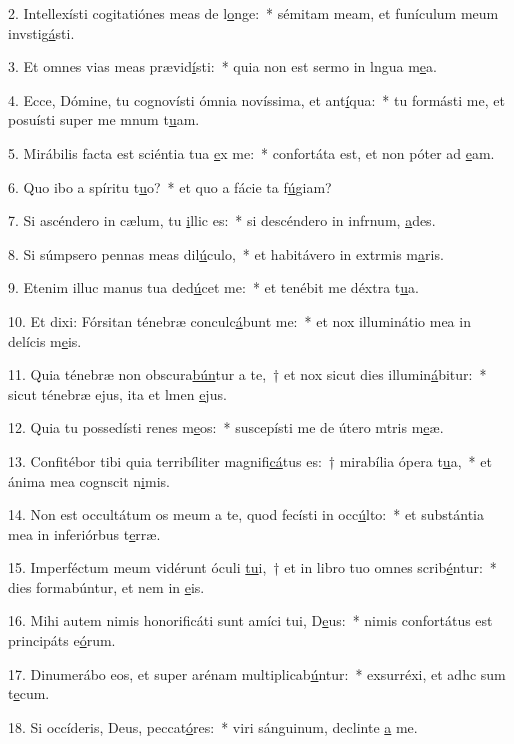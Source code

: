2. Intellexísti cogitatiónes meas de l\uline{o}nge:~* sémitam meam, et funículum meum invstig\uline{á}sti.\par 
3. Et omnes vias meas prævid\uline{í}sti:~* quia non est sermo in lngua m\uline{e}a.\par 
4. Ecce, Dómine, tu cognovísti ómnia novíssima, et ant\uline{í}qua:~* tu formásti me, et posuísti super me mnum t\uline{u}am.\par 
5. Mirábilis facta est sciéntia tua \uline{e}x me:~* confortáta est, et non póter ad \uline{e}am.\par 
6. Quo ibo a spíritu t\uline{u}o?~* et quo a fácie ta f\uline{ú}giam?\par 
7. Si ascéndero in cælum, tu \uline{i}llic es:~* si descéndero in infrnum, \uline{a}des.\par 
8. Si súmpsero pennas meas dil\uline{ú}culo,~* et habitávero in extrmis m\uline{a}ris.\par 
9. Etenim illuc manus tua ded\uline{ú}cet me:~* et tenébit me déxtra t\uline{u}a.\par 
10. Et dixi: Fórsitan ténebræ conculc\uline{á}bunt me:~* et nox illuminátio mea in delícis m\uline{e}is.\par 
11. Quia ténebræ non obscura\uline{bún}tur a te,~† et nox sicut dies illumin\uline{á}bitur:~* sicut ténebræ ejus, ita et lmen \uline{e}jus.\par 
12. Quia tu possedísti renes m\uline{e}os:~* suscepísti me de útero mtris m\uline{e}æ.\par 
13. Confitébor tibi quia terribíliter magnifi\uline{cá}tus es:~† mirabília ópera t\uline{u}a,~* et ánima mea cognscit n\uline{i}mis.\par 
14. Non est occultátum os meum a te, quod fecísti in occ\uline{ú}lto:~* et substántia mea in inferiórbus t\uline{e}rræ.\par 
15. Imperféctum meum vidérunt óculi \uline{tu}i,~† et in libro tuo omnes scrib\uline{é}ntur:~* dies formabúntur, et nem in \uline{e}is.\par 
16. Mihi autem nimis honorificáti sunt amíci tui, D\uline{e}us:~* nimis confortátus est principáts e\uline{ó}rum.\par 
17. Dinumerábo eos, et super arénam multiplicab\uline{ú}ntur:~* exsurréxi, et adhc sum t\uline{e}cum.\par 
18. Si occíderis, Deus, peccat\uline{ó}res:~* viri sánguinum, declinte \uline{a} me.\par 
